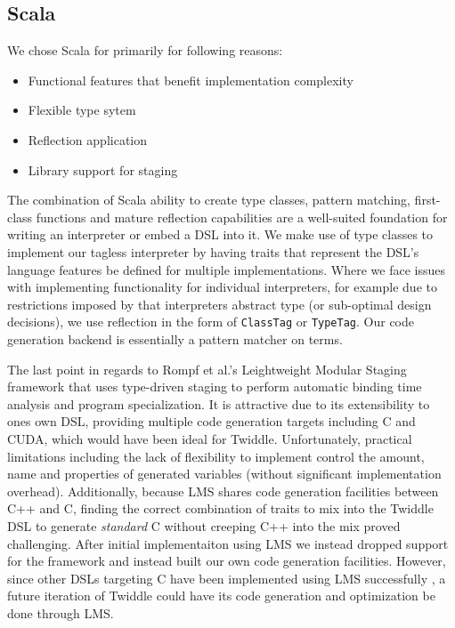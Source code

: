 \documentclass{article}
\begin{document}
\subsection{Scala}
We chose Scala for primarily for following reasons:
\begin{itemize}
	\item Functional features that benefit implementation complexity
	\item Flexible type sytem
	\item Reflection application
	\item Library support for staging
\end{itemize}

The combination of Scala ability to create type classes, pattern matching, first-class functions and mature reflection capabilities are a well-suited foundation
for writing an interpreter or embed a DSL into it. We make use of type classes \cite{wadler1989make} to implement our tagless interpreter by having traits that represent
the DSL's language features be defined for multiple implementations. Where we face issues with implementing functionality for individual interpreters, for example due to restrictions imposed by
that interpreters abstract type (or sub-optimal design decisions), we use reflection in the form of \texttt{ClassTag} or \texttt{TypeTag}. Our code generation backend is essentially a
pattern matcher on terms.

The last point in regards to Rompf et al.'s Leightweight Modular Staging framework \cite{rompf2010lightweight} that uses type-driven staging to perform automatic binding time analysis and
program specialization. It is attractive due to its extensibility to ones own DSL, providing multiple code generation targets including C and CUDA, which would have been ideal for Twiddle. Unfortunately, practical
limitations including the lack of flexibility to implement control the amount, name and properties of generated variables (without significant implementation overhead). Additionally, because LMS shares code generation
facilities between C++ and C, finding the correct combination of traits to mix into the Twiddle DSL to generate \textit{standard} C without creeping C++ into the mix proved challenging. After initial implementaiton using LMS
we instead dropped support for the framework and instead built our own code generation facilities. However, since other DSLs targeting C have been implemented using LMS successfully \cite{lee2011implementing, amin2017lms}, a future iteration of Twiddle could have its
code generation and optimization be done through LMS.
\end{document}
